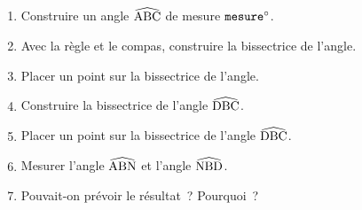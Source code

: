 \documentclass[exercice]{thedocument}%
\begin{document}
%
\begin{enumerate}
    \item Construire un angle $\widehat{\text{ABC}}$ de mesure $\<mesure;^\circ$.
    \item Avec la règle et le compas, construire la bissectrice de l'angle.
    \item Placer un point  sur la bissectrice de l'angle.
    \item Construire la bissectrice de l'angle $\widehat{\text{DBC}}$.
    \item Placer un point  sur la bissectrice de l'angle $\widehat{\text{DBC}}$.
    \item Mesurer l'angle $\widehat{\text{ABN}}$ et l'angle $\widehat{\text{NBD}}$.
    \item Pouvait-on prévoir le résultat~? Pourquoi~?
\end{enumerate}
\end{document}
